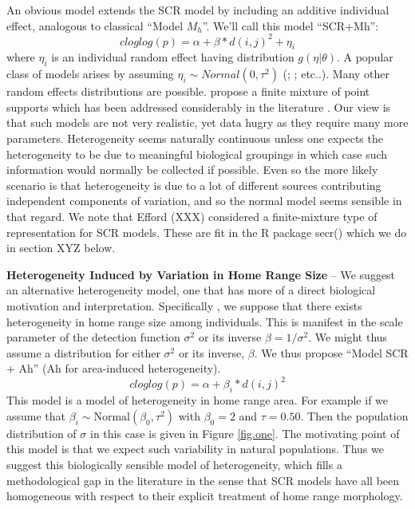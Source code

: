 An obvious model extends the SCR model by including an additive individual effect, analogous to classical ``Model $M_{h}$''. We'll call this model ``SCR+Mh'':
\[
 cloglog(p) = \alpha + \beta*d(i,j)^2  + \eta_{i}
\]
where $\eta_{i}$ is an individual random effect having distribution
$g(\eta|\theta)$.  A popular class of models arises by assuming
$\eta_{i} \sim Normal(0,\tau^{2})$ (\citet{coull_agresti:1999};
\citet{dorazio_royle:2003}; etc..).  Many other random effects
distributions are possible. \citet{norris_pollock:1996} propose a
finite mixture of point supports which has been addressed considerably
in the literature \citep{pledger:2003; dorazio_royle:2003; link:2003}.  Our view is that such models are not very realistic, yet data hugry as they require many more parameters. Heterogeneity seems naturally continuous unless one expects the heterogeneity to be due to meaningful biological groupings in which case such information would normally be collected if possible.  Even so the more likely scenario is that heterogeneity is due to a lot of different sources contributing independent components of variation, and so the normal model seems sensible in that regard. We note that Efford (XXX) considered a finite-mixture type of representation for SCR models. These are fit in the R package secr() which we do in section XYZ below.

{\bf Heterogeneity Induced by Variation in Home Range Size} -- We suggest an alternative heterogeneity model, one that has more of a direct biological motivation and interpretation. Specifically , we suppose that there exists heterogeneity in home range size among individuals. This is manifest in the scale parameter of the detection function $\sigma^{2}$ or its inverse $\beta = 1/\sigma^{2}$. We might
thus assume a distribution for either $\sigma^{2}$ or its inverse,
$\beta$.  We thus propose ``Model SCR + Ah'' (Ah for area-induced
heterogeneity).
\[
 cloglog(p) = \alpha + \beta_{i}*d(i,j)^2
\]
This model is a model of heterogeneity in home range area. For example
if we assume that $\beta_{i} \sim \mbox{Normal}(\beta_0,\tau^{2})$
with $\beta_{0} = 2$ and $\tau = 0.50$. Then the population
distribution of $\sigma$ in this case is given in Figure
\ref{fig.one}. The motivating point of this model is that we expect
such variability in natural populations. Thus we suggest this
biologically sensible model of heterogeneity, which fills a
methodological gap in the literature in the sense that SCR models have
all been homogeneous with respect to their explicit treatment of home
range morphology.

